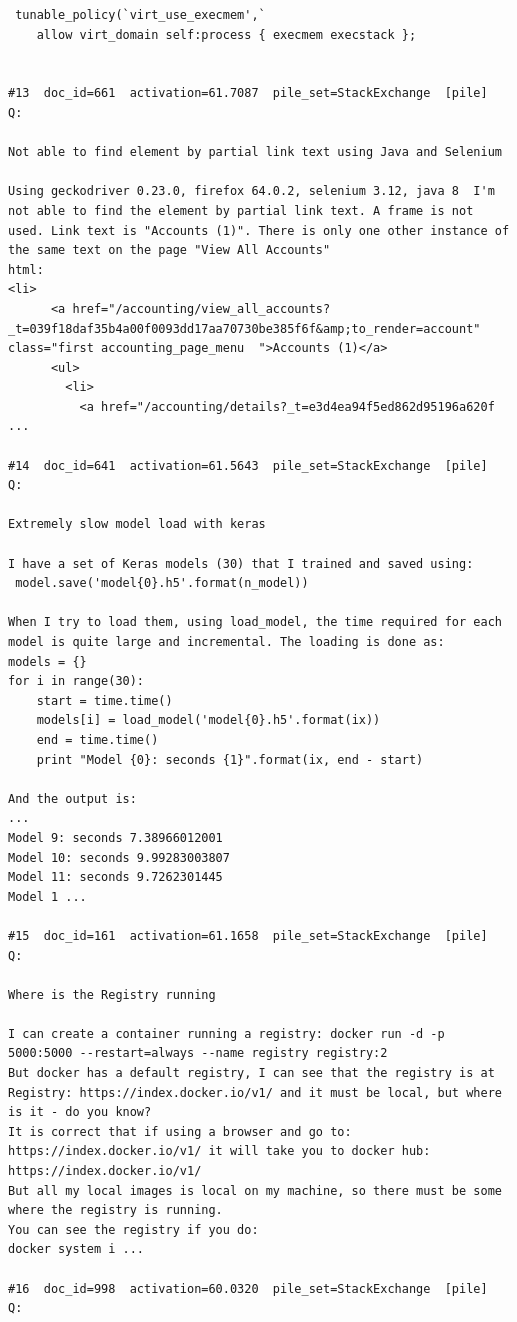 \begin{verbatim}
 tunable_policy(`virt_use_execmem',`
 	allow virt_domain self:process { execmem execstack };


#13  doc_id=661  activation=61.7087  pile_set=StackExchange  [pile]
Q:

Not able to find element by partial link text using Java and Selenium

Using geckodriver 0.23.0, firefox 64.0.2, selenium 3.12, java 8  I'm not able to find the element by partial link text. A frame is not used. Link text is "Accounts (1)". There is only one other instance of the same text on the page "View All Accounts"
html:
<li>    
      <a href="/accounting/view_all_accounts?_t=039f18daf35b4a00f0093dd17aa70730be385f6f&amp;to_render=account" class="first accounting_page_menu  ">Accounts (1)</a>
      <ul>
        <li>
          <a href="/accounting/details?_t=e3d4ea94f5ed862d95196a620f ...

#14  doc_id=641  activation=61.5643  pile_set=StackExchange  [pile]
Q:

Extremely slow model load with keras

I have a set of Keras models (30) that I trained and saved using:
 model.save('model{0}.h5'.format(n_model))

When I try to load them, using load_model, the time required for each model is quite large and incremental. The loading is done as:
models = {}
for i in range(30):
    start = time.time()
    models[i] = load_model('model{0}.h5'.format(ix)) 
    end = time.time()
    print "Model {0}: seconds {1}".format(ix, end - start)

And the output is:
...
Model 9: seconds 7.38966012001
Model 10: seconds 9.99283003807
Model 11: seconds 9.7262301445
Model 1 ...

#15  doc_id=161  activation=61.1658  pile_set=StackExchange  [pile]
Q:

Where is the Registry running

I can create a container running a registry: docker run -d -p 5000:5000 --restart=always --name registry registry:2
But docker has a default registry, I can see that the registry is at Registry: https://index.docker.io/v1/ and it must be local, but where is it - do you know?
It is correct that if using a browser and go to: https://index.docker.io/v1/ it will take you to docker hub: https://index.docker.io/v1/
But all my local images is local on my machine, so there must be some where the registry is running.
You can see the registry if you do:
docker system i ...

#16  doc_id=998  activation=60.0320  pile_set=StackExchange  [pile]
Q:


\end{verbatim}
